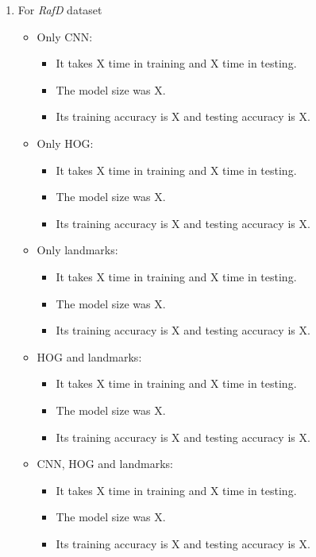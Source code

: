 \documentclass{article}
\begin{document}
\begin{enumerate}
\begin{itemize}
\begin{itemize}
        \end{itemize}
\end{itemize}
\item For \textit{RafD} dataset \newline
\begin{itemize}
    \item Only CNN: 
        \begin{itemize}
            \item It takes X time in training and X time in testing.
            \item The model size was X.
            \item Its training accuracy is X and testing accuracy is X.
        \end{itemize}
    \item Only HOG: 
        \begin{itemize}
            \item It takes X time in training and X time in testing.
            \item The model size was X.
            \item Its training accuracy is X and testing accuracy is X.
        \end{itemize}
    \item Only landmarks: 
        \begin{itemize}
            \item It takes X time in training and X time in testing.
            \item The model size was X.
            \item Its training accuracy is X and testing accuracy is X.
        \end{itemize}
    \item HOG and landmarks: 
        \begin{itemize}
            \item It takes X time in training and X time in testing.
            \item The model size was X.
            \item Its training accuracy is X and testing accuracy is X.
        \end{itemize}
    \item CNN, HOG and landmarks: 
        \begin{itemize}
            \item It takes X time in training and X time in testing.
            \item The model size was X.
            \item Its training accuracy is X and testing accuracy is X.

\end{itemize}
\end{itemize}
\end{enumerate}
\end{document}
